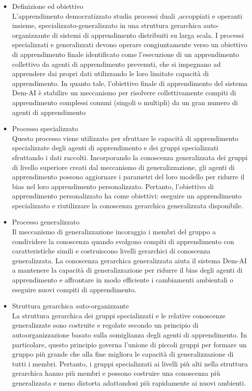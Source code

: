 \begin{itemize}

  \item Definizione ed obiettivo\\
  L'apprendimento democratizzato studia processi duali ,accoppiati e operanti insieme, specializzato-generalizzato in una struttura gerarchica auto-organizzante di sistemi di apprendimento distribuiti su larga scala. I processi specializzati e generalizzati devono operare congiuntamente verso un obiettivo di apprendimento finale identificato come l'esecuzione di un apprendimento collettivo da agenti di apprendimento prevenuti, che si impegnano ad apprendere dai propri dati utilizzando le loro limitate capacità di apprendimento. In quanto tale, l'obiettivo finale di apprendimento del sistema Dem-AI è stabilire un meccanismo per risolvere collettivamente compiti di apprendimento complessi comuni (singoli o multipli) da un gran numero di agenti di apprendimento
  \item Processo specializzato\\
  Questo processo viene utilizzato per sfruttare le capacità di apprendimento specializzate degli agenti di apprendimento e dei gruppi specializzati sfruttando i dati raccolti. Incorporando la conoscenza generalizzata dei gruppi di livello superiore creati dal meccanismo di generalizzazione, gli agenti di apprendimento possono aggiornare i parametri del loro modello per ridurre il bias nel loro apprendimento personalizzato.
Pertanto, l'obiettivo di apprendimento personalizzato ha come obiettivi: eseguire un apprendimento specializzato e riutilizzare la conoscenza gerarchica generalizzata disponibile.
  \item Processo generalizzato\\
  Il meccanismo di generalizzazione incoraggia i membri del gruppo a condividere la conoscenza quando svolgono compiti di apprendimento con caratteristiche simili e costruiscono livelli gerarchici di conoscenza generalizzata. La conoscenza gerarchica generalizzata aiuta il sistema Dem-AI a mantenere la capacità di generalizzazione per ridurre il bias degli agenti di apprendimento e affrontare in modo efficiente i cambiamenti ambientali o eseguire nuovi compiti di apprendimento.
  
  \item Struttura gerarchica auto-organizzante\\
  La struttura gerarchica dei gruppi specializzati e le relative conoscenze generalizzate sono costruite e regolate secondo un principio di autoorganizzazione basato sulla somiglianza degli agenti di apprendimento. In particolare, questo principio governa l'unione di piccoli gruppi per formare un gruppo più grande che alla fine migliora le capacità di generalizzazione di tutti i membri. Pertanto, i gruppi specializzati ai livelli più alti nella struttura gerarchica hanno più membri e possono costruire una conoscenza più generalizzata e meno distorta adattandosi più rapidamente ai nuovi ambienti.
  

\end{itemize}
